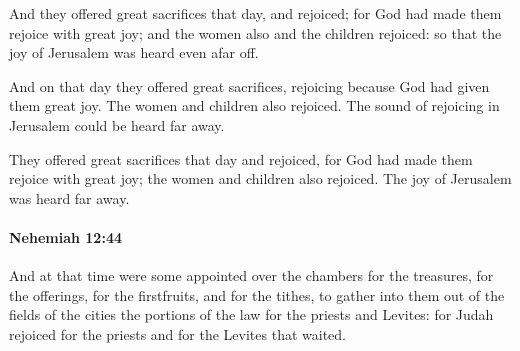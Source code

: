 			\begin{versebox}
					\item[BHS] 
					\item[LXX] 
					\item[ASV] And they offered great sacrifices that day, and rejoiced; for God had made them rejoice with great joy; and the women also and the children rejoiced: so that the joy of Jerusalem was heard even afar off.
					\item[NIV] And on that day they offered great sacrifices, rejoicing because God had given them great joy. The women and children also rejoiced. The sound of rejoicing in Jerusalem could be heard far away.
					\item[NRSV] They offered great sacrifices that day and rejoiced, for God had made them rejoice with great joy; the women and children also rejoiced. The joy of Jerusalem was heard far away.
			\end{versebox}

		\paragraph{Nehemiah 12:44} %
			\label{NEHEMIAH-12-44}

			And at that time were some appointed over the chambers for the treasures, for the offerings, for the firstfruits, and for the tithes, to gather into them out of the fields of the cities the portions of the law for the priests and Levites: for Judah rejoiced for the priests and for the Levites that waited.


